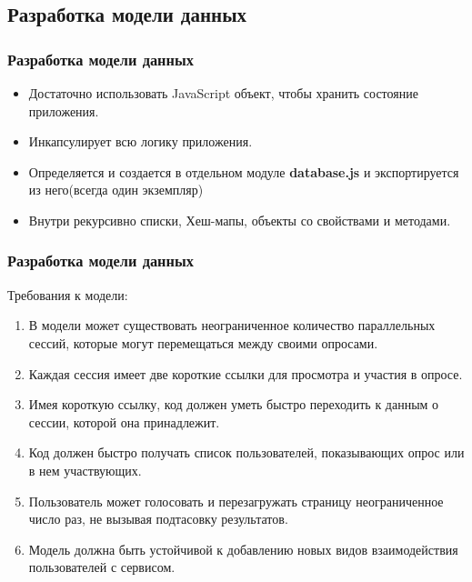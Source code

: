 \documentclass{beamer}
\begin{document}
\subsection{Разработка модели данных}
\begin{frame}
\frametitle{Разработка модели данных}
	\begin{itemize}
		\item Достаточно использовать JavaScript объект, чтобы хранить состояние приложения.
		\item Инкапсулирует всю логику приложения.
		\item Определяется и создается в отдельном модуле \textbf{database.js} и экспортируется из него(всегда один экземпляр)
		\item Внутри рекурсивно списки, Хеш-мапы, объекты со свойствами и методами.
	\end{itemize}
\end{frame}


\begin{frame}
\frametitle{Разработка модели данных}
	Требования к модели:
\begin{enumerate}
	\item В модели может существовать неограниченное количество параллельных сессий, которые могут перемещаться между своими опросами.
	\item Каждая сессия имеет две короткие ссылки для просмотра и участия в опросе. 
	\item Имея короткую ссылку, код должен уметь быстро переходить к данным о сессии, которой она принадлежит.
	\item Код должен быстро получать список пользователей, показывающих опрос или в нем участвующих.
	\item Пользователь может голосовать и перезагружать страницу неограниченное число раз, не вызывая подтасовку результатов.
	\item Модель должна быть устойчивой к добавлению новых видов взаимодействия пользователей с сервисом.
\end{enumerate}
\end{frame}


\end{document}
